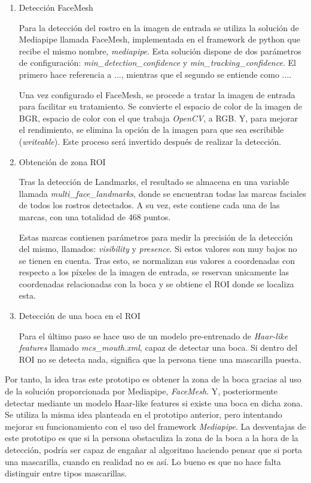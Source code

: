 \begin{enumerate}
	\item Detección FaceMesh
	
	Para la detección del rostro en la imagen de entrada se utiliza la solución de Mediapipe llamada FaceMesh, implementada en el framework de python que recibe el mismo nombre, \textit{mediapipe}. Esta solución dispone de dos parámetros de configuración: \textit{min\_detection\_confidence} y \textit{min\_tracking\_confidence}. El primero hace referencia a ..., mientras que el segundo se entiende como ....
	
	Una vez configurado el FaceMesh, se procede a tratar la imagen de entrada para facilitar su tratamiento. Se convierte el espacio de color de la imagen de BGR, espacio de color con el que trabaja \textit{OpenCV}, a RGB. Y, para mejorar el rendimiento, se elimina la opción de la imagen para que sea escribible (\textit{writeable}). Este proceso será invertido después de realizar la detección.
	
	\item Obtención de zona ROI
	
	Tras la detección de Landmarks, el resultado se almacena en una variable llamada \textit{multi\_face\_landmarks}, donde se encuentran todas las marcas faciales de todos los rostros detectados. A su vez, este contiene cada una de las marcas, con una totalidad de 468 puntos.

	Estas marcas contienen parámetros para medir la precisión de la detección del mismo, llamados: \textit{visibility} y \textit{presence}. Si estos valores son muy bajos no se tienen en cuenta. Tras esto, se normalizan sus valores a coordenadas con respecto a los píxeles de la imagen de entrada, se reservan unicamente las coordenadas relacionadas con la boca y se obtiene el ROI donde se localiza esta.
	
	\item Detección de una boca en el ROI 
	
	Para el último paso se hace uso de un modelo pre-entrenado de \textit{Haar-like features} llamado \textit{mcs\_mouth.xml}, capaz de detectar una boca. Si dentro del ROI no se detecta nada, significa que la persona tiene una mascarilla puesta.
\end{enumerate}

Por tanto, la idea tras este prototipo es obtener la zona de la boca gracias al uso de la solución proporcionada por Mediapipe, \textit{FaceMesh}. Y, posteriormente detectar mediante un modelo Haar-like features si existe una boca en dicha zona. Se utiliza la misma idea planteada en el prototipo anterior, pero intentando mejorar su funcionamiento con el uso del framework \textit{Mediapipe}. La desventajas de este prototipo es que si la persona obstaculiza la zona de la boca a la hora de la detección, podría ser capaz de engañar al algoritmo haciendo pensar que si porta una mascarilla, cuando en realidad no es así. Lo bueno es que no hace falta distinguir entre tipos mascarillas.

